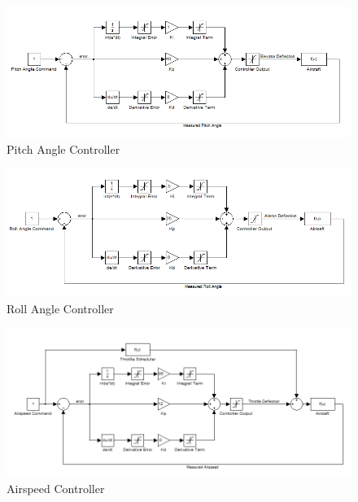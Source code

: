 \documentclass[11pt]{article}
\begin{document}
\begin{figure}[h!]
\centering
\includegraphics[width=\textwidth]{./Figures/PitchAngleController}
\caption{Pitch Angle Controller}
\label{fig:PitchAngleController}
\end{figure}

\begin{figure}[h!]
\centering
\includegraphics[width=\textwidth]{./Figures/RollAngleController}
\caption{Roll Angle Controller}
\label{fig:RollAngleController}
\end{figure}

\begin{figure}[h!]
\centering
\includegraphics[width=\textwidth]{./Figures/AirspeedController}
\caption{Airspeed Controller}
\label{fig:AirspeedController}
\end{figure}
\end{document}
